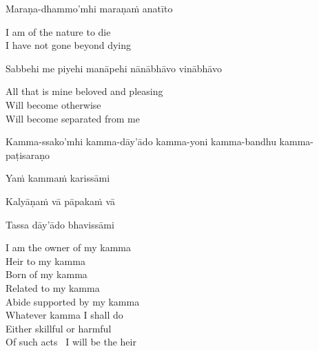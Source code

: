Maraṇa-dhammo'mhi maraṇaṁ anatīto

\begin{english}
  I am of the nature to die\\
  I have not gone beyond dying
\end{english}

Sabbehi me piyehi manāpehi nānābhāvo vinābhāvo

\begin{english}
  All that is mine beloved and pleasing\\
  Will become otherwise\\
  Will become separated from me
\end{english}

\begin{pali-hang}
  Kamma-ssako'mhi kamma-dāy'ādo kamma-yoni kamma-bandhu kamma-paṭisaraṇo\\
\end{pali-hang}
\begin{pali-hangtogether}
  Yaṁ kammaṁ karissāmi\\
\end{pali-hangtogether}
\begin{pali-hangtogether}
  Kalyāṇaṁ vā pāpakaṁ vā\\
\end{pali-hangtogether}
\begin{pali-hangtogether}
  Tassa dāy'ādo bhavissāmi
\end{pali-hangtogether}

\begin{english-verses}
  I am the owner of my kamma\\
  Heir to my kamma\\
  Born of my kamma\\
  Related to my kamma\\
  Abide supported by my kamma\\
  Whatever kamma I shall do\\
  Either skillful or harmful\\
  Of such acts \breathmark\ I will be the heir\makeatletter\hyperlink{endnote98-appendix}\makeatother
\end{english-verses}

